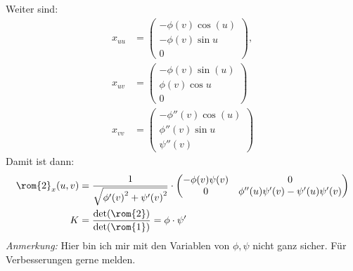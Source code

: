 \begin{solution}
\begin{enumerate}[label=(\alph*)]
  Weiter sind:
  \begin{align*}
    x_{uu} &= \begin{pmatrix}
      -\phi(v)\cos(u) \\
      -\phi(v) \sin u \\
      0
    \end{pmatrix}, \\
    x_{uv} &= \begin{pmatrix}
      -\phi(v)\sin(u) \\
      \phi(v) \cos u \\
      0
    \end{pmatrix} \\
    x_{vv} &= \begin{pmatrix}
      -\phi''(v)\cos(u) \\
      \phi''(v) \sin u \\
      \psi''(v)
    \end{pmatrix} 
  \end{align*}
  Damit ist dann: 
  \begin{align*}
    \rom{2}_x(u,v) &= \frac{1}{\sqrt{ {\phi'(v)}^2 + {\psi'(v)}^2}} \cdot \begin{pmatrix}
      -\phi(v) \psi(v) & 0 \\
      0 & \phi''(u) \psi'(v) - \psi'(u)\psi'(v)
    \end{pmatrix} \\ 
    K &= \frac{\det(\rom{2})}{\det(\rom{1})} = \phi \cdot \psi'
  \end{align*}
  \emph{Anmerkung:} Hier bin ich mir mit den Variablen von \( \phi, \psi \) nicht ganz sicher. Für Verbesserungen gerne melden.


\end{enumerate}
\end{solution}
